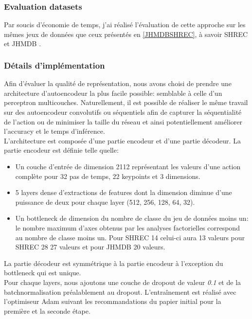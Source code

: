 \subsubsection{Evaluation datasets}
Par soucis d'économie de temps, j'ai réalisé l'évaluation de cette approche sur les mêmes jeux de données que ceux présentés en \ref{JHMDBSHREC}, à savoir SHREC \cite{de2017shrec} et JHMDB \cite{jhuang2013towards}.\\

\subsubsection{Détails d'implémentation}

Afin d'évaluer la qualité de représentation, nous avons choisi de prendre une architecture d'autoencodeur la plus facile possible: semblable à celle d'un perceptron multicouches. Naturellement, il est possible de réaliser le même travail sur des autoencodeur convolutifs ou séquentiels afin de capturer la séquentialité de l'action ou de minimiser la taille du réseau et ainsi potentiellement améliorer l'accuracy et le temps d'inférence.\\

L'architecture est composée d'une partie encodeur et d'une partie décodeur.
La partie encodeur est définie telle quelle:
\begin{itemize}
    \item Un couche d'entrée de dimension 2112 représentant les valeurs d'une action complète pour 32 pas de temps, 22 keypoints et  3 dimensions.
    \item 5 layers dense d'extractions de features dont la dimension diminue d'une puissance de deux pour chaque layer (512, 256, 128, 64, 32).
    \item Un bottleneck de dimension du nombre de classe du jeu de données moins un: le nombre maximum d'axes obtenus par les analyses factorielles correspond au nombre de classe moins un. Pour SHREC 14 celui-ci aura 13 valeurs pour SHREC 28 27 valeurs et pour JHMDB 20 valeurs.
\end{itemize}

La partie décodeur est symmétrique à la partie encodeur à l'exception du bottleneck qui est unique.\\
Pour chaque layers, nous ajoutons une couche de dropout de valeur \textit{0.1} et de la batchnormalisation préalablement au dropout.
L’entraînement est réalisé avec l'optimiseur Adam \cite{kingma2014adam} suivant les recommandations du papier initial pour la première et la seconde étape.\\

